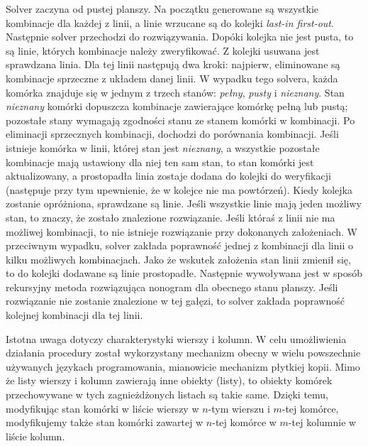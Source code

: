     Solver zaczyna od pustej planszy. Na początku generowane są wszystkie kombinacje dla każdej z
linii, a linie wrzucane są do kolejki \textit{last-in first-out}. Następnie solver przechodzi do
rozwiązywania. Dopóki kolejka nie jest pusta, to są linie, których kombinacje należy zweryfikować.
Z kolejki usuwana jest sprawdzana linia. Dla tej linii następują dwa kroki: najpierw, eliminowane
są kombinacje sprzeczne z układem danej linii. W wypadku tego solvera, każda komórka znajduje się
w jednym z trzech stanów: \textit{pełny}, \textit{pusty} i \textit{nieznany}. Stan \textit{nieznany}
komórki dopuszcza kombinacje zawierające komórkę pełną lub pustą; pozostałe stany wymagają
zgodności stanu ze stanem komórki w kombinacji. Po eliminacji sprzecznych kombinacji, dochodzi
do porównania kombinacji. Jeśli istnieje komórka w linii, której stan jest \textit{nieznany}, a
wszystkie pozostałe kombinacje mają ustawiony dla niej ten sam stan, to stan komórki jest aktualizowany,
a prostopadła linia zostaje dodana do kolejki do weryfikacji (następuje przy tym upewnienie, że
w kolejce nie ma powtórzeń). Kiedy kolejka zostanie opróżniona, sprawdzane są linie.
Jeśli wszystkie linie mają jeden możliwy stan, to znaczy, że zostało znalezione rozwiązanie. Jeśli
któraś z linii nie ma możliwej kombinacji, to nie istnieje rozwiązanie przy dokonanych założeniach.
W przeciwnym wypadku, solver zakłada poprawność jednej z kombinacji dla linii
o kilku możliwych kombinacjach. Jako że wskutek założenia stan linii zmienił się, to do kolejki
dodawane są linie prostopadłe. Następnie wywoływana jest w sposób rekursyjny metoda rozwiązująca
nonogram dla obecnego stanu planszy. Jeśli rozwiązanie nie zostanie znalezione w tej gałęzi, to
solver zakłada poprawność kolejnej kombinacji dla tej linii.

    Istotna uwaga dotyczy charakterystyki wierszy i kolumn. W celu umożliwienia działania procedury
został wykorzystany mechanizm obecny w wielu powszechnie używanych językach programowania, mianowicie
mechanizm płytkiej kopii. Mimo że listy wierszy i kolumn zawierają inne obiekty (listy), to obiekty
komórek przechowywane w tych zagnieżdżonych listach są takie same. Dzięki temu, modyfikując stan
komórki w liście wierszy w $n$-tym wierszu i $m$-tej komórce, modyfikujemy także stan komórki
zawartej w $n$-tej komórce w $m$-tej kolumnie w liście kolumn.

